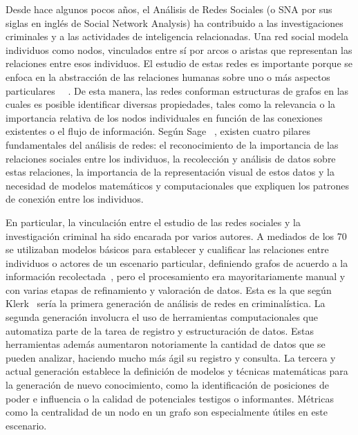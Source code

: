
Desde hace algunos pocos años, el Análisis de Redes Sociales (o SNA por sus siglas en inglés de Social Network Analysis) ha contribuido a las investigaciones criminales y a las actividades de inteligencia relacionadas.
Una red social modela individuos como nodos, vinculados entre sí por arcos o aristas que representan las relaciones entre esos individuos. El estudio de estas redes es importante porque se enfoca en la abstracción de las relaciones humanas sobre uno o más aspectos particulares ~\cite{pm2018practical}~\cite{burcher2020social}. De esta manera, las redes conforman estructuras de grafos en las cuales es posible identificar diversas propiedades, tales como la relevancia o la importancia relativa de los nodos individuales en función de las conexiones existentes o el flujo de información. Según Sage~\cite{scott2011sage} , existen cuatro pilares fundamentales del análisis de redes: el reconocimiento de la importancia de las relaciones sociales entre los individuos, la recolección y análisis de datos sobre estas relaciones, la importancia de la representación visual de estos datos y la necesidad de modelos matemáticos y computacionales que expliquen los patrones de conexión entre los individuos.

En particular, la vinculación entre el estudio de las redes sociales y la investigación criminal ha sido encarada por varios autores. A mediados de los 70 se utilizaban modelos básicos para establecer y cualificar las relaciones entre individuos o actores de un escenario particular, definiendo grafos de acuerdo a la información recolectada~\cite{harper1975application}, pero el procesamiento era mayoritariamente manual y con varias etapas de refinamiento y valoración de datos. Esta es la que según Klerk~\cite{Klerks1999TheNP} sería la primera generación de análisis de redes en criminalística. La segunda generación involucra el uso de herramientas computacionales que automatiza parte de la tarea de registro y estructuración de datos. Estas herramientas además aumentaron notoriamente la cantidad de datos que se pueden analizar, haciendo mucho más ágil su registro y consulta. La tercera y actual generación establece la definición de modelos y técnicas matemáticas para la generación de nuevo conocimiento, como la identificación de posiciones de poder e influencia o la calidad de potenciales testigos o informantes. Métricas como la centralidad de un nodo en un grafo son especialmente útiles en este escenario.

